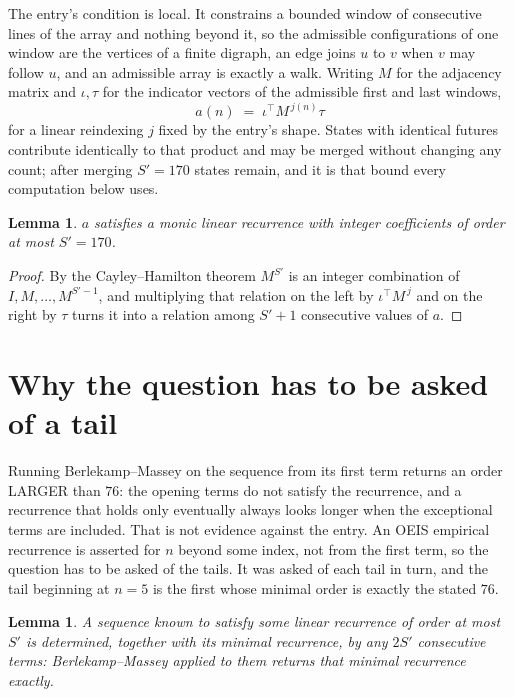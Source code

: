 \documentclass[11pt,a4paper]{article}
\theoremstyle{plain}
\newtheorem{lemma}[theorem]{Lemma}
\theoremstyle{definition}
\begin{document}
The entry's condition is local. It constrains a bounded window of consecutive lines of the
array and nothing beyond it, so the admissible configurations of one window are the vertices of
a finite digraph, an edge joins $u$ to $v$ when $v$ may follow $u$, and an admissible array is
exactly a walk. Writing $M$ for the adjacency matrix and $\iota,\tau$ for the indicator vectors
of the admissible first and last windows,
\[
a(n)\;=\;\iota^{\!\top}M^{\,j(n)}\tau
\]
for a linear reindexing $j$ fixed by the entry's shape. States with identical futures
contribute identically to that product and may be merged without changing any count; after
merging $S'=170$ states remain, and it is that bound every computation below uses.

\begin{lemma}\label{lem:cf}
$a$ satisfies a monic linear recurrence with integer coefficients of order at most $S'=170$.
\end{lemma}

\begin{proof}
By the Cayley--Hamilton theorem $M^{S'}$ is an integer combination of $I,M,\dots,M^{S'-1}$,
and multiplying that relation on the left by $\iota^{\!\top}M^{\,j}$ and on the right by
$\tau$ turns it into a relation among $S'+1$ consecutive values of $a$.
\end{proof}

\section{Why the question has to be asked of a tail}

Running Berlekamp--Massey on the sequence from its first term returns an order LARGER than $76$: the opening terms do not satisfy the recurrence, and a recurrence that holds only eventually always looks longer when the exceptional terms are included. That is not evidence against the entry. An OEIS empirical recurrence is asserted for $n$ beyond some index, not from the first term, so the question has to be asked of the tails. It was asked of each tail in turn, and the tail beginning at $n=5$ is the first whose minimal order is exactly the stated $76$.

\begin{lemma}\label{lem:bm}
A sequence known to satisfy some linear recurrence of order at most $S'$ is determined,
together with its minimal recurrence, by any $2S'$ consecutive terms: Berlekamp--Massey applied
to them returns that minimal recurrence exactly.
\end{lemma}
\end{document}
